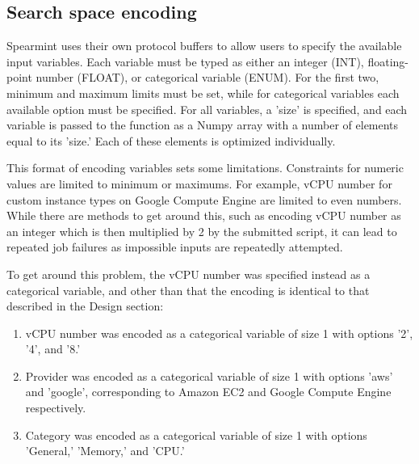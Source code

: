\documentclass{report}
\begin{document}
\subsection{Search space encoding}
Spearmint uses their own protocol buffers to allow users to specify the available input variables. Each variable must be typed as either an integer (INT), floating-point number (FLOAT), or categorical variable (ENUM). For the first two, minimum and maximum limits must be set, while for categorical variables each available option must be specified. For all variables, a 'size' is specified, and each variable is passed to the function as a Numpy\cite{Klein2014} array with a number of elements equal to its 'size.' Each of these elements is optimized individually.

This format of encoding variables sets some limitations. Constraints for numeric values are limited to minimum or maximums. For example, vCPU number for custom instance types on Google Compute Engine are limited to even numbers. While there are methods to get around this, such as encoding vCPU number as an integer which is then multiplied by 2 by the submitted script, it can lead to repeated job failures as impossible inputs are repeatedly attempted.

To get around this problem, the vCPU number was specified instead as a categorical variable, and other than that the encoding is identical to that described in the Design section:
\begin{enumerate}
\item vCPU number was encoded as a categorical variable of size 1 with options '2', '4', and '8.' 
\item Provider was encoded as a categorical variable of size 1 with options 'aws' and 'google', corresponding to Amazon EC2 and Google Compute Engine respectively.
\item Category was encoded as a categorical variable of size 1 with options 'General,' 'Memory,' and 'CPU.'
\end{enumerate}
\end{document}
